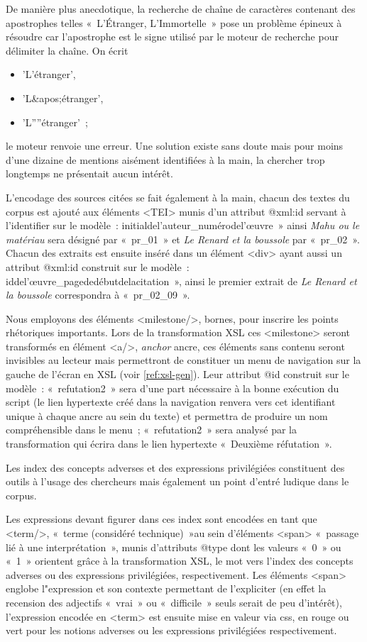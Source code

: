 \documentclass[12pt, a4paper]{article}
\begin{document}
De manière plus anecdotique, la recherche de chaîne de caractères contenant des apostrophes telles «~L'Étranger, L'Immortelle~» pose un problème épineux à résoudre car l'apostrophe est le signe utilisé par le moteur de recherche pour délimiter la chaîne. On écrit 
\begin{itemize}
    \item 'L'étranger', 
    \item 'L\&apos;étranger',
    \item 'L''''étranger'~; 
\end{itemize}
le moteur renvoie une erreur. Une solution existe sans doute mais pour moins d'une dizaine de mentions aisément identifiées à la main, la chercher trop longtemps ne présentait aucun intérêt.


L'encodage des sources citées se fait également à la main, chacun des textes du corpus est ajouté aux éléments <TEI> munis d'un attribut @xml\NoAutoSpaceBeforeFDP:id servant à l'identifier sur le modèle~: initialdel'auteur\_numérodel'œuvre~» ainsi \textit{Mahu ou le matériau} sera désigné par «~pr\_01~» et \textit{Le Renard et la boussole} par «~pr\_02~». Chacun des extraits est ensuite inséré dans un élément <div> ayant aussi un attribut @xml\NoAutoSpaceBeforeFDP:id construit sur le modèle~: iddel'œuvre\_pagededébutdelacitation~», ainsi le premier extrait de \textit{Le Renard et la boussole} correspondra à «~pr\_02\_09~».    

\label{encMilestone} Nous employons des éléments <milestone/>, bornes, pour inscrire les points rhétoriques importants. Lors de la transformation XSL ces <milestone> seront transformés en élément <a/>, \textit{anchor} ancre, ces éléments sans contenu seront invisibles au lecteur mais permettront de constituer un menu de navigation sur la gauche de l'écran en XSL (voir \ref{ref:xsl-gen}). Leur attribut @id construit sur le modèle~: «~refutation2~»
sera d'une part nécessaire à la bonne exécution du script (le lien hypertexte créé dans la navigation renvera vers cet identifiant unique à chaque ancre au sein du texte) et permettra de produire un nom compréhensible dans le menu~; «~refutation2~» sera analysé par la transformation qui écrira dans le lien hypertexte «~Deuxième réfutation~».



Les index des concepts adverses et des expressions privilégiées constituent des outils à l'usage des chercheurs mais également un point d'entré ludique dans le corpus.

 \label{encW} Les expressions devant figurer dans ces index sont encodées en tant que <term/>, «~terme (considéré technique)~»au sein d'éléments <span> «~passage lié à une interprétation~», munis d'attributs @type dont les valeurs «~0~» ou «~1~» orientent grâce à la transformation XSL, le mot vers l'index des concepts adverses ou des expressions privilégiées, respectivement. Les éléments <span> englobe l"expression et son contexte permettant de l'expliciter (en effet la recension des adjectifs «~vrai~» ou «~difficile~»  seuls serait de peu d'intérêt), l'expression encodée en <term> est ensuite mise en valeur via css, en rouge ou vert pour les notions adverses ou les expressions privilégiées respectivement.
\end{document}
